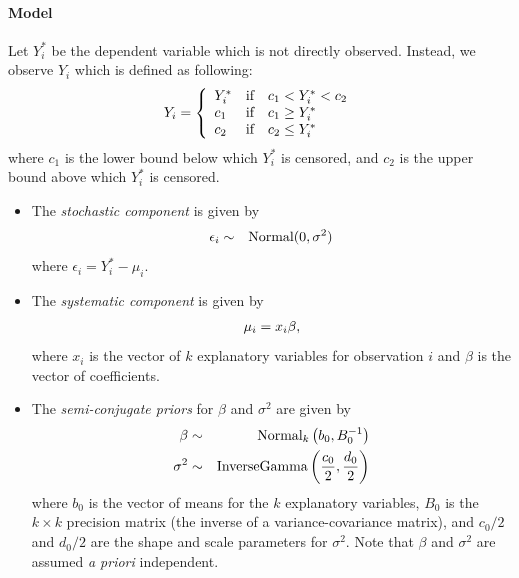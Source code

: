 \documentclass[letterpaper,10pt,english]{sphinxmanual}
\begin{document}
\paragraph{Model}
\label{zelig-tobitbayes:model}
Let \(Y_i^*\) be the dependent variable which is not directly
observed. Instead, we observe \(Y_i\) which is defined as following:
\begin{gather}
\begin{split}Y_i = \left\{
\begin{array}{lcl}
Y_i^*  &\textrm{if} & c_1<Y_i^*<c_2 \\
c_1    &\textrm{if} & c_1 \ge Y_i^* \\
c_2    &\textrm{if} & c_2 \le Y_i^*
\end{array}\right.\end{split}\notag
\end{gather}
where \(c_1\) is the lower bound below which \(Y_i^*\) is
censored, and \(c_2\) is the upper bound above which \(Y_i^*\)
is censored.
\begin{itemize}
\item {} 
The \emph{stochastic component} is given by
\begin{gather}
\begin{split}\begin{aligned}
\epsilon_{i}  &  \sim & \textrm{Normal}(0, \sigma^2)\end{aligned}\end{split}\notag
\end{gather}
where \(\epsilon_{i}=Y^*_i-\mu_i\).

\item {} 
The \emph{systematic component} is given by
\begin{gather}
\begin{split}\begin{aligned}
\mu_{i}= x_{i} \beta,\end{aligned}\end{split}\notag
\end{gather}
where \(x_{i}\) is the vector of \(k\) explanatory variables
for observation \(i\) and \(\beta\) is the vector of
coefficients.

\item {} 
The \emph{semi-conjugate priors} for \(\beta\) and \(\sigma^2\)
are given by
\begin{gather}
\begin{split}\begin{aligned}
\beta & \sim & \textrm{Normal}_k \left( b_{0},B_{0}^{-1}\right) \\
\sigma^{2} & \sim & \textrm{InverseGamma} \left( \frac{c_0}{2}, \frac{d_0}{2}
\right) \end{aligned}\end{split}\notag
\end{gather}
where \(b_{0}\) is the vector of means for the \(k\)
explanatory variables, \(B_{0}\) is the \(k\times k\)
precision matrix (the inverse of a variance-covariance matrix), and
\(c_0/2\) and \(d_0/2\) are the shape and scale parameters
for \(\sigma^{2}\). Note that \(\beta\) and \(\sigma^2\)
are assumed \emph{a priori} independent.

\end{itemize}
\end{document}
